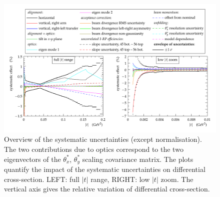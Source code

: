 \begin{figure}
\begin{center}
\includegraphics[width=18cm]{fig/systematic_uncertainties.pdf}
\caption{%
Overview of the systematic uncertainties (except normalisation). The two contributions due to optics correspond to the two eigenvectors of the $\theta_x^*$, $\theta_y^*$ scaling covariance matrix.
The plots quantify the impact of the systematic uncertainties on differential cross-section. LEFT: full $|t|$ range, RIGHT: low $|t|$ zoom. The vertical axis gives the relative variation of differential cross-section.
}
\label{fig:syst unc}
\end{center}
\end{figure}
